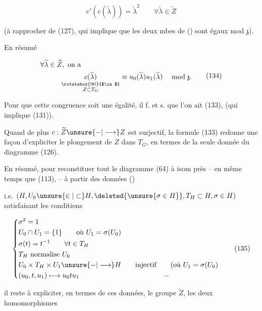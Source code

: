 \[c'(c(\widetilde\lambda))=\widetilde\lambda^2\qquad\forall\widetilde\lambda\in\widetilde Z\tag*{(133)}\]

(à rapprocher de (127), qui implique que les deux mbes de () sont égaux mod $\mathfrak{z}$).

En résumé

\[\begin{aligned}
&\forall\widetilde\lambda\in\widetilde Z,\ \text{on a}\\
&\hspace{3em}\underset{\substack{\rotatebox{90}{$\in$}\\Z\subset T_G}}{c(\widetilde\lambda)}
\equiv u_0(\widetilde\lambda)u_1(\widetilde\lambda)\quad\bmod\mathfrak{z}.
\end{aligned}\tag*{(134)}\]

Pour que cette congruence soit une égalité, il f. et s. que l'on ait (133), (qui implique (131)).

Quand de plus  $c:\widetilde Z\unsure{-|\longrightarrow}Z$ est surjectif, la formule (133) redonne une façon d'expliciter le plongement de $Z$ dans $T_G$, en termes de la seule donnée du diagramme (126).

En résumé, pour reconstituer tout le diagramme (64) à isom près -- en même temps que (113), -- à partir des données ()


i.e. $(H,U_0\unsure{\in|\subset}H,\deleted{\unsure{\sigma\in H}}, T_H\subset H,\sigma\in H)$ satisfaisant les conditions


\[\left\{\begin{aligned}
&\sigma^2=1\\
&U_0\cap U_1=\{1\}\qquad\text{où }U_1=\sigma(U_0)\\
&\sigma(t)=t^{-1}\qquad\forall t\in T_H\\
&T_H\text{ normalise }U_0\\
&U_0\times T_H\times U_1\unsure{-|\longrightarrow} H\qquad\text{injectif}\qquad(\text{où }U_1=\sigma(U_0)\\
&(u_0,t,u_1)\longmapsto u_0tu_1\hspace{12em}-
\end{aligned}\right.\tag*{(135)}\]

il reste à expliciter, en termes de ces données, le groupe $\widetilde Z$, les deux homomorphismes

